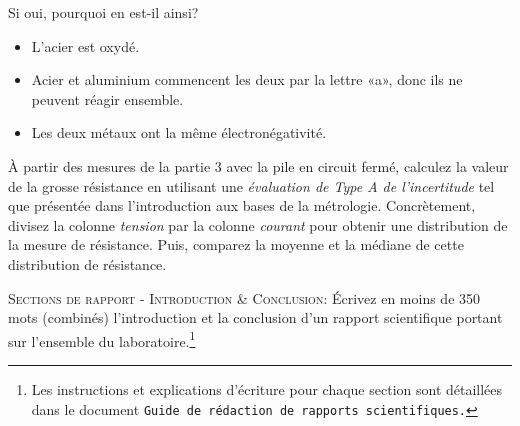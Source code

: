 \documentclass[canadien,12pt,oneside,letterpaper]{article}
\begin{document}
\begin{gradescope}
\begin{gradescope}
    \item Si oui, pourquoi en est-il ainsi?
        \begin{itemize}[label=$\blacktriangleright$]
        \item L'acier est oxydé.
        \item Acier et aluminium commencent les deux par la lettre «a», donc ils ne peuvent réagir ensemble.
        \item Les deux métaux ont la même électronégativité.
        \end{itemize}
    \end{gradescope}
\item À partir des mesures de la partie 3 avec la pile en circuit fermé, calculez la valeur de la grosse résistance en utilisant une \textit{évaluation de Type A de l'incertitude} tel que présentée dans l’introduction aux bases de la métrologie. Concrètement, divisez la colonne \textit{tension} par la colonne \textit{courant} pour obtenir une distribution de la mesure de résistance. Puis, comparez la moyenne et la médiane de cette distribution de résistance.%
\item \textsc{Sections de rapport - Introduction \& Conclusion:} Écrivez en moins de 350 mots (combinés) l'introduction et la conclusion d'un rapport scientifique portant sur l'ensemble du laboratoire.\footnote{Les instructions et explications d'écriture pour chaque section sont détaillées dans le document \texttt{Guide de rédaction de rapports scientifiques.}}
\end{gradescope}
\end{document}
